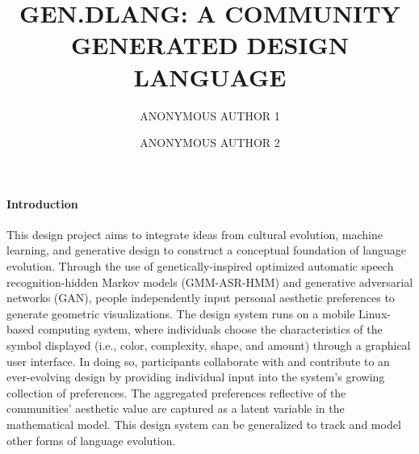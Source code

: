 \documentclass{evolang12}
\begin{document}
\title{GEN.DLANG: A COMMUNITY GENERATED DESIGN LANGUAGE}
\author[*1]{ANONYMOUS AUTHOR 1}
\author[2]{ANONYMOUS AUTHOR 2}





\maketitle

\paragraph{Introduction}
\frenchspacing
This design project aims to integrate ideas from cultural evolution, machine learning, and generative design to construct a conceptual foundation of language evolution. Through the use of genetically-inspired optimized automatic speech recognition-hidden Markov models (GMM-ASR-HMM) and generative adversarial networks (GAN), people independently input personal aesthetic preferences to generate geometric visualizations. The design system runs on a mobile Linux-based computing system, where individuals choose the characteristics of the symbol displayed (i.e., color, complexity, shape, and amount) through a graphical user interface. In doing so, participants collaborate with and contribute to an ever-evolving design by providing individual input into the system's growing collection of preferences. The aggregated preferences reflective of the communities' aesthetic value are captured as a latent variable in the mathematical model. This design system can be generalized to track and model other forms of language evolution.
\end{document}
